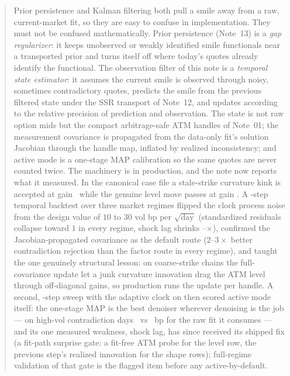 \documentclass[11pt]{article}
\begin{document}
\begin{abstract}
Prior persistence and Kalman filtering both pull a smile away from a raw,
current-market fit, so they are easy to confuse in implementation. They must
not be confused mathematically. Prior persistence (Note~13) is a \emph{gap
regularizer}: it keeps unobserved or weakly identified smile functionals near
a transported prior and turns itself off where today's quotes already identify
the functional. The observation filter of this note is a \emph{temporal state
estimator}: it assumes the current smile is observed through noisy, sometimes
contradictory quotes, predicts the smile from the previous filtered state
under the SSR transport of Note~12, and updates according to the relative
precision of prediction and observation. The state is not raw option mids but
the compact arbitrage-safe ATM handles of Note~01; the measurement covariance
is propagated from the data-only fit's solution Jacobian through the handle
map, inflated by realized inconsistency; and active mode is a one-stage MAP
calibration so the same quotes are never counted twice. The machinery is in
production, and the note now reports what it measured. In the canonical case
file a stale-strike curvature kink is accepted at gain \KalGainCurv\ while the
genuine level move passes at gain \KalGainLevel. A \KalStepsTotal-step
temporal backtest over three market regimes flipped the clock process noise
from the design value of $10$ to $30$ vol bp per $\sqrt{\text{day}}$
(standardized residuals collapse toward $1$ in every regime, shock lag shrinks
\KalShockImproveMin--\KalShockImproveMax$\times$), confirmed the
Jacobian-propagated covariance as the default route ($2$--$3\times$ better
contradiction rejection than the factor route in every regime), and taught the
one genuinely structural lesson: on coarse-strike chains the full-covariance
update let a junk curvature innovation drag the ATM level through off-diagonal
gains, so production runs the update per handle. A second,
\KalStepsVTwo-step sweep with the adaptive clock on then scored active mode
itself: the one-stage MAP is the best denoiser wherever denoising is the job
--- on high-vol contradiction days \KalActContraHigh\ vs \KalRawContraHigh\ bp
for the raw fit it consumes --- and its one measured weakness, shock lag,
has since received its shipped fix (a fit-path surprise gate: a fit-free
ATM probe for the level row, the previous step's realized innovation for
the shape rows); full-regime validation of that gate is the flagged item
before any active-by-default.
\end{abstract}
\end{document}
